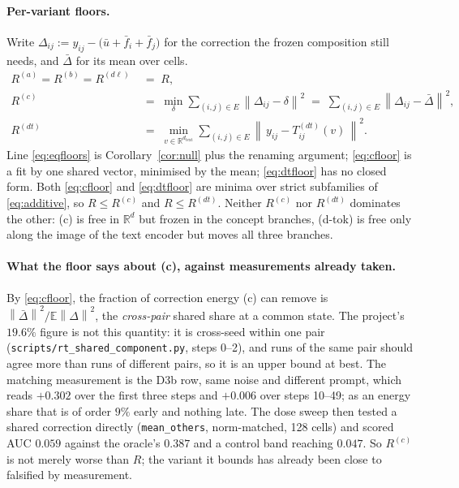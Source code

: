 \documentclass[11pt]{article}
\newcommand{\E}{\mathbb{E}}
\newcommand{\R}{\mathbb{R}}
\newcommand{\norm}[1]{\left\lVert #1 \right\rVert}
\theoremstyle{plain}
\theoremstyle{remark}
\begin{document}
\paragraph{Per-variant floors.}
Write $\Delta_{ij} := y_{ij} - \big(\bar u + \bar f_i + \bar f_j\big)$ for the correction the
frozen composition still needs, and $\bar\Delta$ for its mean over cells.
\begin{align}
  R^{(a)} = R^{(b)} = R^{(d\ell)} &\;=\; R ,
  \label{eq:eqfloors}\\
  R^{(c)} &\;=\; \min_{\delta} \sum_{(i,j)\in E} \norm{\Delta_{ij} - \delta}^2
  \;=\; \sum_{(i,j)\in E} \norm{\Delta_{ij} - \bar\Delta}^2 ,
  \label{eq:cfloor}\\
  R^{(dt)} &\;=\; \min_{v \in \R^{d_\mathrm{text}}} \sum_{(i,j)\in E}
  \norm{\,y_{ij} - T^{(dt)}_{ij}(v)\,}^2 .
  \label{eq:dtfloor}
\end{align}
Line \eqref{eq:eqfloors} is Corollary~\ref{cor:null} plus the renaming argument;
\eqref{eq:cfloor} is a fit by one shared vector, minimised by the mean; \eqref{eq:dtfloor} has
no closed form. Both \eqref{eq:cfloor} and \eqref{eq:dtfloor} are minima over strict subfamilies of
\eqref{eq:additive}, so $R \le R^{(c)}$ and $R \le R^{(dt)}$. Neither $R^{(c)}$ nor $R^{(dt)}$
dominates the other: (c) is free in $\R^d$ but frozen in the concept branches, (d-tok) is free
only along the image of the text encoder but moves all three branches.

\paragraph{What the floor says about (c), against measurements already taken.}
By \eqref{eq:cfloor}, the fraction of correction energy (c) can remove is
$\norm{\bar\Delta}^2 / \E\norm{\Delta}^2$, the \emph{cross-pair} shared share at a common
state. The project's $19.6\%$ figure is not this quantity: it is cross-seed within one pair
(\texttt{scripts/rt\_shared\_component.py}, steps 0--2), and runs of the same pair should agree
more than runs of different pairs, so it is an upper bound at best. The matching measurement is
the D3b row, same noise and different prompt, which reads $+0.302$ over the first three steps
and $+0.006$ over steps 10--49; as an energy share that is of order $9\%$ early and nothing
late. The dose sweep then tested a shared correction directly (\texttt{mean\_others},
norm-matched, 128 cells) and scored AUC $0.059$ against the oracle's $0.387$ and a control band
reaching $0.047$. So $R^{(c)}$ is not merely worse than $R$; the variant it bounds has already
been close to falsified by measurement.
\end{document}
